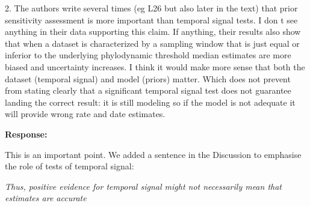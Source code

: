 \documentclass[11pt]{article}
\begin{document}
2. The authors write several times (eg L26 but also later in the text) that prior sensitivity assessment is more important than temporal signal tests. I don t see anything in their data supporting this claim. If anything, their results also show that when a dataset is characterized by a sampling window that is just equal or inferior to the underlying phylodynamic threshold median estimates are more biased and uncertainty increases. I think it would make more sense that both the dataset (temporal signal) and model (priors) matter. Which does not prevent from stating clearly that a significant temporal signal test does not guarantee landing the correct result: it is still modeling so if the model is not adequate it will provide wrong rate and date estimates.
{\color{blue} \textbf{Response:}

This is an important point. We added a sentence in the Discussion to emphasise the role of tests of temporal signal:

\textit{Thus, positive evidence for temporal signal might not necessarily mean that estimates are accurate}
}





%

\end{document}
